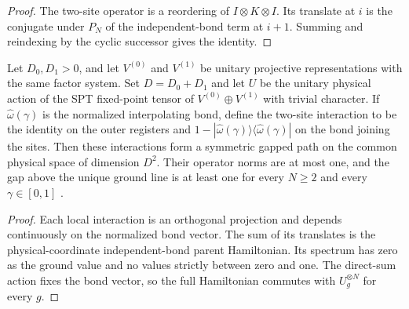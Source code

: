 \begin{proof}\leanok
    The two-site operator is a reordering of
    $I\otimes K\otimes I$. Its translate at $i$ is the conjugate
    under $P_N$ of the independent-bond term at $i+1$. Summing and
    reindexing by the cyclic successor gives the identity.
\end{proof}

\begin{lemma}
    \label{thm:spt_direct_sum_fixed_point_path}
    \leanok
    Let $D_0,D_1>0$, and let $V^{(0)}$ and $V^{(1)}$ be unitary
    projective representations with the same factor system. Set
    $D=D_0+D_1$ and let $U$ be the unitary physical action of the SPT
    fixed-point tensor of $V^{(0)}\oplus V^{(1)}$ with trivial
    character. If $\widehat\omega(\gamma)$ is the normalized
    interpolating bond, define the two-site interaction to be the
    identity on the outer registers and
    $1-|\widehat\omega(\gamma)\rangle
        \langle\widehat\omega(\gamma)|$
    on the bond joining the sites. Then these interactions form a
    symmetric gapped path on the common physical space of dimension
    $D^2$. Their operator norms are at most one, and the gap above the
    unique ground line is at least one for every $N\ge2$ and every
    $\gamma\in[0,1]$ \cite[Section~II.F.2]{Schuch2011Phases}.
\end{lemma}

\begin{proof}\leanok
    Each local interaction is an orthogonal projection and depends
    continuously on the normalized bond vector. The sum of its
    translates is the physical-coordinate independent-bond parent
    Hamiltonian. Its spectrum has zero as the ground value and no
    values strictly between zero and one. The direct-sum action fixes
    the bond vector, so the full Hamiltonian commutes with
    $U_g^{\otimes N}$ for every $g$.
\end{proof}

